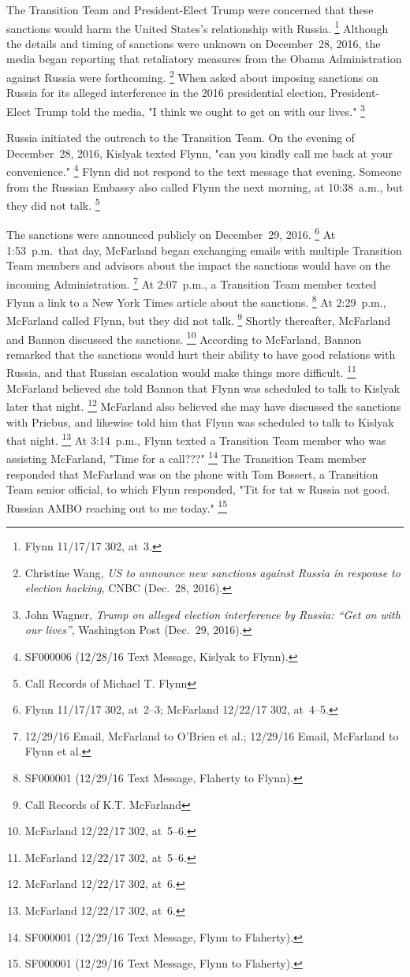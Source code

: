 The Transition Team and President-Elect Trump were concerned that these sanctions would harm the United States's relationship with Russia.%
\footnote{Flynn 11/17/17 302, at~3.}
Although the details and timing of sanctions were unknown on December~28, 2016, the media began reporting that retaliatory measures from the Obama Administration against Russia were forthcoming.%
\footnote{Christine Wang, \textit{US to announce new sanctions against Russia in response to election hacking}, CNBC (Dec.~28, 2016).}
When asked about imposing sanctions on Russia for its alleged interference in the 2016 presidential election, President-Elect Trump told the media, "I think we ought to get on with our lives."%
\footnote{John Wagner, \textit{Trump on alleged election interference by Russia: ``Get on with our lives''}, Washington Post (Dec.~29, 2016).}

Russia initiated the outreach to the Transition Team.
On the evening of December~28, 2016, Kislyak texted Flynn, "can you kindly call me back at your convenience."%
\footnote{SF000006 (12/28/16 Text Message, Kislyak to Flynn).}
Flynn did not respond to the text message that evening.
Someone from the Russian Embassy also called Flynn the next morning, at 10:38~a.m., but they did not talk.%
\footnote{Call Records of Michael T. Flynn }

The sanctions were announced publicly on December~29, 2016.%
\footnote{Flynn 11/17/17 302, at~2--3;
McFarland 12/22/17 302, at~4--5.}
At 1:53~p.m.\ that day, McFarland began exchanging emails with multiple Transition Team members and advisors about the impact the sanctions would have on the incoming Administration.%
\footnote{12/29/16 Email, McFarland to O'Brien et al.;
12/29/16 Email, McFarland to Flynn et al.}
At 2:07~p.m., a Transition Team member texted Flynn a link to a New York Times article about the sanctions.%
\footnote{SF000001 (12/29/16 Text Message, Flaherty to Flynn).}
At 2:29~p.m., McFarland called Flynn, but they did not talk.%
\footnote{Call Records of K.T. McFarland }
Shortly thereafter, McFarland and Bannon discussed the sanctions.%
\footnote{McFarland 12/22/17 302, at~5--6.}
According to McFarland, Bannon remarked that the sanctions would hurt their ability to have good relations with Russia, and that Russian escalation would make things more difficult.%
\footnote{McFarland 12/22/17 302, at~5--6.}
McFarland believed she told Bannon that Flynn was scheduled to talk to Kislyak later that night.%
\footnote{McFarland 12/22/17 302, at~6.}
McFarland also believed she may have discussed the sanctions with Priebus, and likewise told him that Flynn was scheduled to talk to Kislyak that night.%
\footnote{McFarland 12/22/17 302, at~6.}
At 3:14~p.m., Flynn texted a Transition Team member who was assisting McFarland, "Time for a call???"%
\footnote{SF000001 (12/29/16 Text Message, Flynn to Flaherty).}
The Transition Team member responded that McFarland was on the phone with Tom Bossert, a Transition Team senior official, to which Flynn responded, "Tit for tat w Russia not good.
Russian AMBO reaching out to me today."%
\footnote{SF000001 (12/29/16 Text Message, Flynn to Flaherty).}

